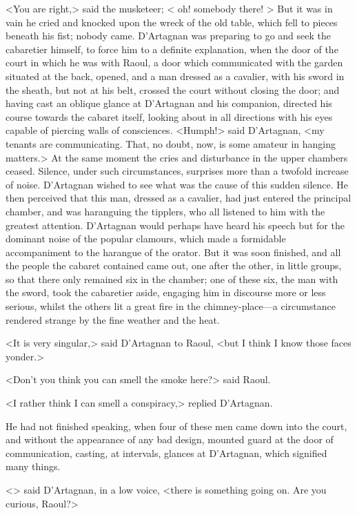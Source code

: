 <You are right,> said the musketeer; < oh! somebody there! > But it was in vain he cried and knocked upon the wreck of the old table, which fell to pieces beneath his fist; nobody came. D'Artagnan was preparing to go and seek the cabaretier himself, to force him to a definite explanation, when the door of the court in which he was with Raoul, a door which communicated with the garden situated at the back, opened, and a man dressed as a cavalier, with his sword in the sheath, but not at his belt, crossed the court without closing the door; and having cast an oblique glance at D'Artagnan and his companion, directed his course towards the cabaret itself, looking about in all directions with his eyes capable of piercing walls of consciences. <Humph!> said D'Artagnan, <my tenants are communicating. That, no doubt, now, is some amateur in hanging matters.> At the same moment the cries and disturbance in the upper chambers ceased. Silence, under such circumstances, surprises more than a twofold increase of noise. D'Artagnan wished to see what was the cause of this sudden silence. He then perceived that this man, dressed as a cavalier, had just entered the principal chamber, and was haranguing the tipplers, who all listened to him with the greatest attention. D'Artagnan would perhaps have heard his speech but for the dominant noise of the popular clamours, which made a formidable accompaniment to the harangue of the orator. But it was soon finished, and all the people the cabaret contained came out, one after the other, in little groups, so that there only remained six in the chamber; one of these six, the man with the sword, took the cabaretier aside, engaging him in discourse more or less serious, whilst the others lit a great fire in the chimney-place—a circumstance rendered strange by the fine weather and the heat.

<It is very singular,> said D'Artagnan to Raoul, <but I think I know those faces yonder.>

<Don't you think you can smell the smoke here?> said Raoul.

<I rather think I can smell a conspiracy,> replied D'Artagnan.

He had not finished speaking, when four of these men came down into the court, and without the appearance of any bad design, mounted guard at the door of communication, casting, at intervals, glances at D'Artagnan, which signified many things.

<> said D'Artagnan, in a low voice, <there is something going on. Are you curious, Raoul?>

